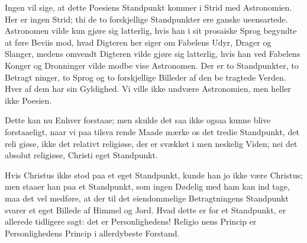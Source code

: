 \documentclass[12pt]{book}
\newcommand{\opage}[1]{\marginnote{\footnotesize\textit{[#1]}}}
\begin{document}
Ingen vil sige, at dette Poesiens Standpunkt kommer
i Strid med Astronomien. Her er ingen Strid; thi de
to forskjellige Standpunkter ere ganske ueensartede.
Astronomen vilde kun gjøre sig latterlig, hvis han i sit
prosaiske Sprog begyndte at føre Beviis mod, hvad
Digteren her siger om Fabelens Udyr, Drager og Slanger,
medens omvendt Digteren vilde gjøre sig latterlig, hvis
han ved Fabelens Konger og Dronninger vilde modbe\-%
vise Astronomen. Der er to Standpunkter, to Betragt\-%
ninger, to Sprog og to forskjellige Billeder af den be\-%
tragtede Verden. Hver af dem har sin Gyldighed. Vi
ville ikke undvære Astronomien, men heller ikke Poesien.

Dette kan nu Enhver forstaae; men skulde det saa
ikke ogsaa kunne blive forstaaeligt, naar vi paa tilsva\-%
rende Maade mærke os det tredie Standpunkt, det reli\-%
giøse, ikke det relativt religiøse, der er svækket i men\-%
\opage{202}\setcounter{footnote}{0}%
neskelig Viden; nei det absolut religiøse, Christi eget
Standpunkt.

Hvis Christus ikke stod paa et eget Standpunkt,
kunde han jo ikke være Christus; men staaer han paa
et Standpunkt, som ingen Dødelig med ham kan ind\-%
tage, maa det vel medføre, at der til det eiendommelige
Betragtningens Standpunkt svarer et eget Billede af
Himmel og Jord. Hvad dette er for et Standpunkt, er
allerede tidligere sagt: det er Personlighedens! Religio\-%
nens Princip er Personlighedens Princip i allerdybeste
Forstand.
\end{document}
